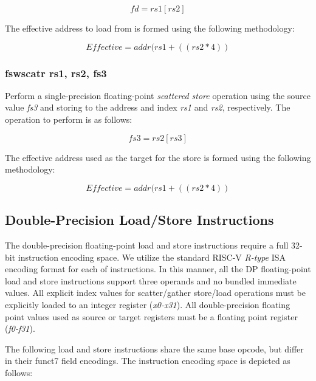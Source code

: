 \documentclass{article}
\begin{document}
\begin{equation}
fd = rs1[rs2]
\end{equation}

The effective address to load
from is formed using the following methodology:

\begin{equation}
Effective = addr(rs1 + ((rs2 * 4))
\end{equation}


\subsubsection{fswscatr rs1, rs2, fs3}

Perform a single-precision floating-point \emph{scattered store} operation 
using the source value \emph{fs3} and storing to the address and index
\emph{rs1} and \emph{rs2}, respectively.  The operation to
perform is as follows: 

\begin{equation}
fs3 = rs2[rs3]
\end{equation}

The effective address used as the target
for the store is formed using the following methodology:

\begin{equation}
Effective = addr(rs1 + ((rs2 * 4))
\end{equation}


\subsection{Double-Precision Load/Store Instructions}

The double-precision floating-point load and store instructions
require a full 32-bit instruction encoding space.  We utilize the 
standard RISC-V \emph{R-type} ISA encoding format for each of instructions.  In
this manner, all the DP floating-point load and store instructions support
three operands and no bundled immediate values.  All explicit index
values for scatter/gather store/load operations must be explicitly
loaded to an integer register (\emph{x0-x31}).  All double-precision
floating point values used as source or target registers must be a floating
point register (\emph{f0-f31}).

The following load and store instructions share the same base
opcode, but differ in their funct7 field encodings.  The instruction
encoding space is depicted as follows:
\end{document}
